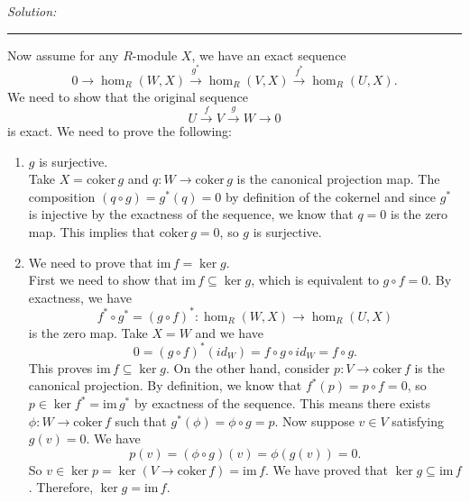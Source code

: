 \documentclass[a4paper, 12pt]{article}
\newenvironment{solution}
    {\textit{Solution:}}
    {}
\newcommand{\im}{\text{im}\,}
\newcommand{\coker}{\text{coker}\,}
\begin{document}
\begin{solution}
\begin{enumerate}[(1)]
\end{enumerate} 
\noindent\rule{7in}{1.5pt}
Now assume for any \(R\)-module \(X\), we have an exact sequence
\[0\rightarrow \hom_R(W,X)\xrightarrow{g^*}\hom_R(V,X)\xrightarrow{f^*}\hom_R(U,X).\]
We need to show that the original sequence
\[U\xrightarrow{f}V\xrightarrow{g}W\rightarrow 0\]
is exact. We need to prove the following:
\begin{enumerate}[(1)]
\item \(g\) is surjective.\\ 
Take \(X=\coker g\) and \(q:W\rightarrow \coker g\) is the canonical projection map. The composition \((q\circ g)=g^*(q)=0\) by definition of the cokernel and since \(g^*\) is injective by the exactness of the sequence, we know that \(q=0\) is the 
zero map. This implies that \(\coker g=0\), so \(g\) is surjective.
\item We need to prove that \(\im f=\ker g\).\\ 
First we need to show that \(\im f\subseteq \ker g\), which is equivalent to \(g\circ f=0\). By exactness, we have 
\[f^*\circ g^*=(g\circ f)^*:\hom _R(W,X)\rightarrow \hom_R(U,X)\]
is the zero map. Take \(X=W\) and we have 
\[0=(g\circ f)^*(id_W)=f\circ g\circ id_W=f\circ g.\]
This proves \(\im f\subseteq \ker g\). On the other hand, consider \(p:V\rightarrow \coker f\) is the canonical projection. By definition, we know that \(f^*(p)=p\circ f=0\), so \(p\in \ker f^*=\im g^*\) by exactness of 
the sequence. This means there exists \(\phi:W\rightarrow \coker f\) such that \(g^*(\phi)=\phi\circ g=p\). Now suppose \(v\in V\) satisfying \(g(v)=0\). We have 
\[p(v)=(\phi\circ g)(v)=\phi(g(v))=0.\]
So \(v\in \ker p=\ker(V\rightarrow \coker f)=\im f\). We have proved that \(\ker g\subseteq \im f\). Therefore, \(\ker g=\im f\).
\end{enumerate}
\end{solution}
\end{document}

